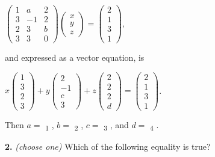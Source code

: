 \documentclass[10pt,a4paper]{article}
\begin{document}
\(\begin{pmatrix}1&a&2\\3&-1&2\\2&3&b\\3&3&0\end{pmatrix}\begin{pmatrix}x\\y\\z\end{pmatrix}=\begin{pmatrix}2\\1\\3\\1\end{pmatrix},\)

and expressed as a vector equation, is

\(x\begin{pmatrix}1\\3\\2\\3\end{pmatrix}+y\begin{pmatrix}2\\-1\\c\\3\end{pmatrix}+z\begin{pmatrix}2\\2\\2\\d\end{pmatrix}=\begin{pmatrix}2\\1\\3\\1\end{pmatrix}\).

Then \(a=\) \underline{\hspace{1.2cm}}\textsubscript{1} 
, \(b=\) \underline{\hspace{1.2cm}}\textsubscript{2} 
, \(c=\) \underline{\hspace{1.2cm}}\textsubscript{3} 
, and \(d=\) \underline{\hspace{1.2cm}}\textsubscript{4} 
.

\smallskip
\textbf{2.} \textit{(choose one)} Which of the following equality is true?
\end{document}
